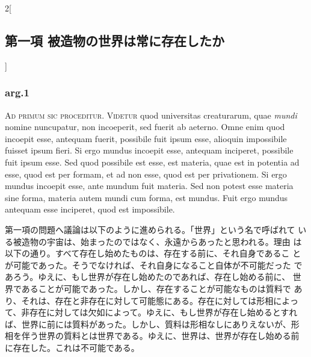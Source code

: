 \documentclass[paper=a4paper,fontsize=10pt,jafontsize=9pt,titlepage]{jlreq}
\begin{document}
\begin{paracol}{2}[\subsection{第一項 被造物の世界は常に存在したか}]

\subsubsection{arg.1}

{\huge A}{\scshape d primum sic proceditur. Videtur} quod universitas creaturarum, quae
{\itshape mundi} nomine nuncupatur,
non incoeperit, sed fuerit ab aeterno. Omne enim quod incoepit esse,
antequam fuerit, possibile fuit ipsum esse, alioquin impossibile
fuisset ipsum fieri. Si ergo mundus incoepit esse, antequam inciperet,
possibile fuit ipsum esse. Sed quod possibile est esse, est materia,
quae est in potentia ad esse, quod est per formam, et ad non esse,
quod est per privationem. Si ergo mundus incoepit esse, ante mundum
fuit materia. Sed non potest esse materia sine forma, materia autem
mundi cum forma, est mundus. Fuit ergo mundus antequam esse inciperet,
quod est impossibile.


\switchcolumn


第一項の問題へ議論は以下のように進められる。「世界」という名で呼ばれて
いる被造物の宇宙は、始まったのではなく、永遠からあったと思われる。理由
は以下の通り。すべて存在し始めたものは、存在する前に、それ自身であるこ
とが可能であった。そうでなければ、それ自身になること自体が不可能だった
であろう。ゆえに、もし世界が存在し始めたのであれば、存在し始める前に、
世界であることが可能であった。しかし、存在することが可能なものは質料で
あり、それは、存在と非存在に対して可能態にある。存在に対しては形相によっ
て、非存在に対しては欠如によって。ゆえに、もし世界が存在し始めるとすれ
ば、世界に前には質料があった。しかし、質料は形相なしにありえないが、形
相を伴う世界の質料とは世界である。ゆえに、世界は、世界が存在し始める前
に存在した。これは不可能である。


\switchcolumn*



\end{paracol}

\end{document}
